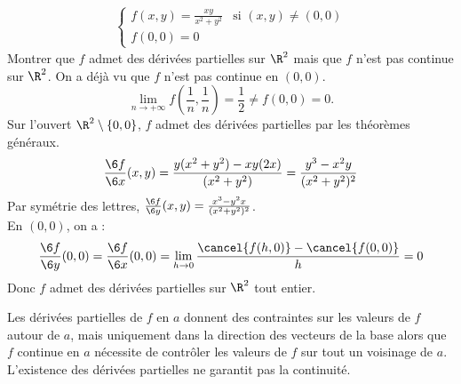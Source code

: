 \documentclass[11pt]{article}
\begin{document}
\vspace*{-0.8cm}

\begin{exercice}{}{}
    \begin{align*}
        \begin{cases}
            f(x,y) = \frac{xy}{x^2+y^2} & \text{si } (x,y)\neq(0,0) \\
            f(0,0) = 0
        \end{cases}
    \end{align*}
    Montrer que $f$ admet des dérivées partielles sur $\R^2$ mais que $f$ n'est pas continue sur $\R^2$.
    \tcblower
    On a déjà vu que $f$ n'est pas continue en $(0,0)$.
    \begin{equation*}
        \lim_{n\to+\infty} f\left( \frac{1}{n}, \frac{1}{n} \right) = \frac{1}{2} \neq f(0,0) = 0.
    \end{equation*}
    Sur l'ouvert $\R^2\setminus\{0,0\}$, $f$ admet des dérivées partielles par les théorèmes généraux.
    \begin{equation*}
        \frac{\6 f}{\6 x}(x,y) = \frac{y(x^2+y^2)-xy(2x)}{(x^2+y^2)} = \frac{y^3 - x^2y}{(x^2+y^2)^2}
    \end{equation*}
    Par symétrie des lettres, $\frac{\6 f}{\6 y}(x,y) = \frac{x^3 - y^2x}{(x^2+y^2)^2}$.\\
    En $(0,0)$, on a :
    \begin{equation*}
        \frac{\6 f}{\6 y}(0,0) = \frac{\6 f}{\6 x}(0,0) = \lim_{h\to 0}\frac{\cancel{f(h,0)} - \cancel{f(0,0)}}{h} = 0
    \end{equation*}
    Donc $f$ admet des dérivées partielles sur $\R^2$ tout entier.
\end{exercice}

\vspace*{-0.5cm}

Les dérivées partielles de $f$ en $a$ donnent des contraintes sur les valeurs de $f$ autour de $a$, mais uniquement dans la direction des vecteurs de la base alors que $f$ continue en $a$ nécessite de contrôler les valeurs de $f$ sur tout un voisinage de $a$. L'existence des dérivées partielles ne garantit pas la continuité. 
\end{document}
